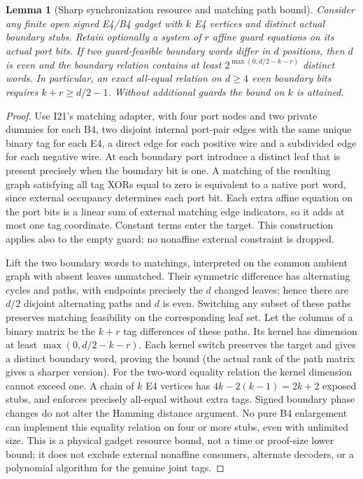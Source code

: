 \documentclass[11pt]{article}
\newtheorem{lemma}[theorem]{Lemma}
\begin{document}
\begin{lemma}[Sharp synchronization resource and matching path bound]\label{lem:bw20-sync}
Consider any finite open signed E4/B4 gadget with $k$ E4 vertices and distinct actual boundary stubs. Retain optionally a system of $r$ affine guard equations on its actual port bits. If two guard-feasible boundary words differ in $d$ positions, then $d$ is even and the boundary relation contains at least $2^{\max(0,d/2-k-r)}$ distinct words. In particular, an exact all-equal relation on $d\ge4$ even boundary bits requires $k+r\ge d/2-1$. Without additional guards the bound on $k$ is attained.
\end{lemma}
\begin{proof}
Use I21's matching adapter, with four port nodes and two private dummies for each B4, two disjoint internal port-pair edges with the same unique binary tag for each E4, a direct edge for each positive wire and a subdivided edge for each negative wire. At each boundary port introduce a distinct leaf that is present precisely when the boundary bit is one. A matching of the resulting graph satisfying all tag XORs equal to zero is equivalent to a native port word, since external occupancy determines each port bit. Each extra affine equation on the port bits is a linear sum of external matching edge indicators, so it adds at most one tag coordinate. Constant terms enter the target. This construction applies also to the empty guard; no nonaffine external constraint is dropped.

Lift the two boundary words to matchings, interpreted on the common ambient graph with absent leaves unmatched. Their symmetric difference has alternating cycles and paths, with endpoints precisely the $d$ changed leaves; hence there are $d/2$ disjoint alternating paths and $d$ is even. Switching any subset of these paths preserves matching feasibility on the corresponding leaf set. Let the columns of a binary matrix be the $k+r$ tag differences of these paths. Its kernel has dimension at least $\max(0,d/2-k-r)$. Each kernel switch preserves the target and gives a distinct boundary word, proving the bound (the actual rank of the path matrix gives a sharper version). For the two-word equality relation the kernel dimension cannot exceed one. A chain of $k$ E4 vertices has $4k-2(k-1)=2k+2$ exposed stubs, and enforces precisely all-equal without extra tags. Signed boundary phase changes do not alter the Hamming distance argument. No pure B4 enlargement can implement this equality relation on four or more stubs, even with unlimited size. This is a physical gadget resource bound, not a time or proof-size lower bound; it does not exclude external nonaffine consumers, alternate decoders, or a polynomial algorithm for the genuine joint tags.
\end{proof}
\end{document}
